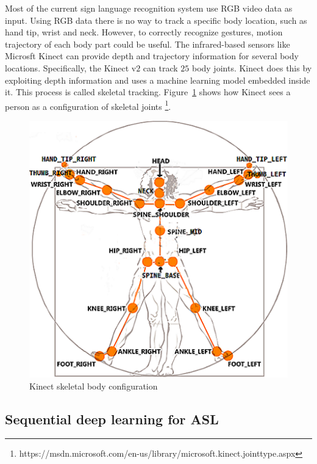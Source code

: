 \documentclass[10pt,twocolumn,letterpaper]{article}
\begin{document}
Most of the 
current sign language recognition system use 
RGB video data as input. Using RGB data there is no way 
to track a specific body location, such as hand tip, wrist and neck. However, 
to correctly recognize gestures, motion trajectory of each body 
part could be useful. The infrared-based sensors like 
Microsft Kinect can provide depth and trajectory information 
for several body locations. 
Specifically, the Kinect v$2$ can 
track $25$ body joints. Kinect does this by exploiting 
depth information and uses 
a machine learning model embedded inside it. 
%
This process is called skeletal tracking. Figure~\ref{fig:kinect_sk} shows
how Kinect sees a person as a configuration of skeletal 
joints \footnote{https://msdn.microsoft.com/en-us/library/microsoft.kinect.jointtype.aspx}. 


\begin{figure}[h]
	\begin{center}
		\includegraphics[width=.8\linewidth]{kinect_sk}
	\end{center}
	\caption{Kinect skeletal body configuration}
	\label{fig:kinect_sk}
\end{figure}



\subsection{Sequential deep learning for ASL}
\end{document}
